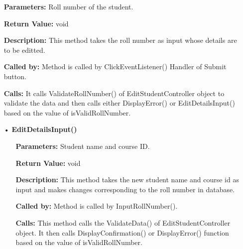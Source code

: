 \documentclass{scrreprt}
\begin{document}
\begin{enumerate}
\begin{itemize}
\begin{itemize}
\item [] \textbf{Parameters:} Roll number of the student. 
\item [] \textbf{Return Value:} void
\item [] \textbf{Description:} This method takes the roll number as input whose details are to be editted.
\item [] \textbf{Called by:} Method is called by ClickEventListener() Handler of Submit button.
\item [] \textbf{Calls:} It calls ValidateRollNumber() of EditStudentController object to validate the data and then calls either DisplayError() or EditDetailsInput() based on the value of isValidRollNumber.
\end{itemize}
\end{itemize}
\begin{itemize}
\item [•] \textbf{EditDetailsInput()}
\begin{itemize}
\item [] \textbf{Parameters:} Student name and course ID.
\item [] \textbf{Return Value:} void
\item [] \textbf{Description:} This method takes the new student name and course id as input and makes changes corresponding to the roll number in database.
\item [] \textbf{Called by:} Method is called by InputRollNumber().
\item [] \textbf{Calls:} This method calls the ValidateData() of EditStudentController object. It then calls DisplayConfirmation() or DisplayError() function based on the value of isValidRollNumber.
\end{itemize}
\end{itemize}


\end{enumerate}
\end{document}
